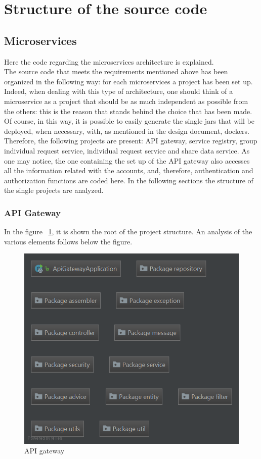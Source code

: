 \section{Structure of the source code}

\subsection{Microservices}
Here the code regarding the microservices architecture is explained. \\
The source code that meets the requirements mentioned above has been organized in the following way: for each microservices a project
has been set up. 
Indeed, when dealing with this type of architecture, one should think of a microservice
as a project that should be as much independent as possible from the others: this is the reason that stands behind the choice that has been
made. 
Of course, in this way, it is possible to easily generate the single jars that will be deployed, when necessary, with, as mentioned
in the design document, dockers. Therefore, the following projects are present: API gateway, service registry, group individual request
service, individual request service and share data service. 
As one may notice, the one containing the set up of the API gateway also accesses all the information related with the accounts, and, therefore, authentication and authorization functions are coded here.
In the following sections the structure of the single projects are analyzed. 

\subsubsection{API Gateway}
In the figure ~\ref{fig:pkgapigateway}, it is shown the root of the project structure. An analysis 
of the various elements follows below the figure. 
\begin{figure}[H]
\includegraphics[width=\linewidth]{images/PackageApigateway.png}
\caption{ API gateway }
\label{fig:pkgapigateway}
\end{figure}

